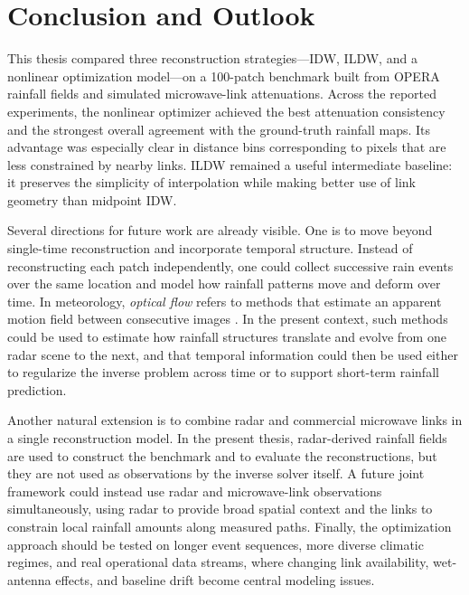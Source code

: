 \documentclass[11pt]{article}
\begin{document}
\section{Conclusion and Outlook}

This thesis compared three reconstruction strategies---IDW, ILDW, and a nonlinear optimization model---on a 100-patch benchmark built from OPERA rainfall fields and simulated microwave-link attenuations. Across the reported experiments, the nonlinear optimizer achieved the best attenuation consistency and the strongest overall agreement with the ground-truth rainfall maps. Its advantage was especially clear in distance bins corresponding to pixels that are less constrained by nearby links. ILDW remained a useful intermediate baseline: it preserves the simplicity of interpolation while making better use of link geometry than midpoint IDW.

Several directions for future work are already visible. One is to move beyond single-time reconstruction and incorporate temporal structure. Instead of reconstructing each patch independently, one could collect successive rain events over the same location and model how rainfall patterns move and deform over time. In meteorology, \emph{optical flow} refers to methods that estimate an apparent motion field between consecutive images \citep{ayzel2019optical}. In the present context, such methods could be used to estimate how rainfall structures translate and evolve from one radar scene to the next, and that temporal information could then be used either to regularize the inverse problem across time or to support short-term rainfall prediction.

Another natural extension is to combine radar and commercial microwave links in a single reconstruction model. In the present thesis, radar-derived rainfall fields are used to construct the benchmark and to evaluate the reconstructions, but they are not used as observations by the inverse solver itself. A future joint framework could instead use radar and microwave-link observations simultaneously, using radar to provide broad spatial context and the links to constrain local rainfall amounts along measured paths. Finally, the optimization approach should be tested on longer event sequences, more diverse climatic regimes, and real operational data streams, where changing link availability, wet-antenna effects, and baseline drift become central modeling issues.
\end{document}
